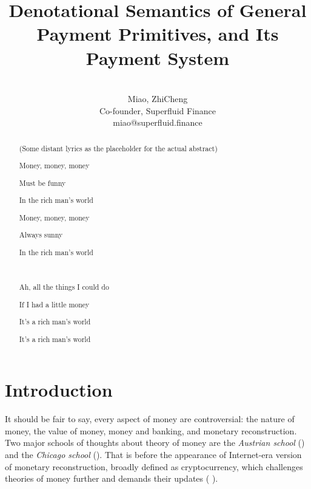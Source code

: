 



\title{Denotational Semantics of General Payment Primitives, and Its Payment System}

\author{\\
    Miao, ZhiCheng\\
    Co-founder, Superfluid Finance\\
    miao@superfluid.finance
}


\maketitle

\begin{abstract}
    \begin{center}
        (Some distant lyrics as the placeholder for the actual abstract)

        Money, money, money

        Must be funny

        In the rich man's world

        Money, money, money

        Always sunny

        In the rich man's world

        \

        Ah, all the things I could do

        If I had a little money

        It's a rich man's world

        It's a rich man's world
    \end{center}
\end{abstract}

\chapter{Introduction}

It should be fair to say, every aspect of money are controversial: the nature of money, the value of
money, money and banking, and monetary reconstruction. Two major schools of thoughts about theory of
money are the \textit{Austrian school} (\cite{von2013theory}) and the \textit{Chicago school}
(\cite{friedman1989quantity}). That is before the appearance of Internet-era version of monetary
reconstruction, broadly defined as cryptocurrency, which challenges theories of money further and
demands their updates (\cite{ammous2018can} \cite{hardle2020understanding}).

